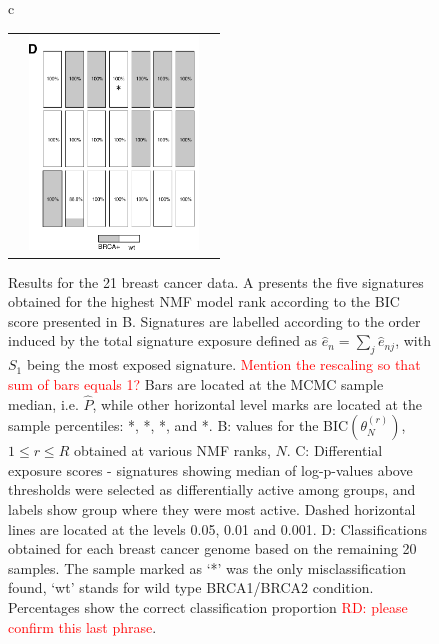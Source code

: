 \documentclass{bioinfo}
\begin{document}
\begin{figure}[t!]
\begin{tabular}{c}
\begin{tabular}{ccc}
     &
 \includegraphics[width=4.5cm]{figs/Classific}
   \end{tabular}
 \end{tabular}
 \caption{\textrm{%
   Results for the 21 breast cancer data. A presents the five
   signatures obtained for the highest NMF model rank according to the
   BIC score presented in B. Signatures are labelled according to the
   order induced by the total signature exposure defined as $\hat e_n =
   \sum_{j} \hat e_{nj}$, with $S_1$ being the most exposed
   signature. \textcolor{red}{Mention the rescaling so that sum of bars
   equals 1?}  Bars are located at the MCMC sample median,
   i.e. $\widehat P$, while other horizontal level marks are located
   at the sample percentiles: *, *, *, and *.
   B: values for the BIC$(\theta^{(r)}_N)$, $1 \leq r \leq R$ obtained at
   various NMF ranks, $N$. C: Differential exposure scores - signatures
   showing median of log-p-values above thresholds were selected as
   differentially active among groups, and labels show group where they
   were most active.  Dashed horizontal lines are located at 
   the levels 0.05, 0.01 and 0.001. D: Classifications
   obtained for each breast cancer genome based on the remaining 20
   samples. The sample marked as `*' was the only
   misclassification found, `wt' stands for wild type BRCA1/BRCA2
   condition. Percentages show the correct classification proportion
   \textcolor{red}{RD: please confirm this last phrase}.
  }
 }\label{fig:bcancer} 
\end{figure}
\end{document}
